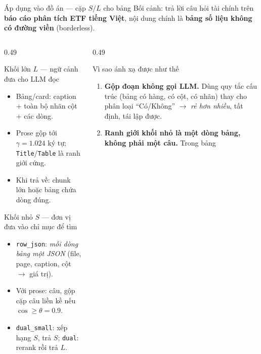 \documentclass[aspectratio=169,10pt]{beamer}
\begin{document}
\begin{frame}{Áp dụng vào đồ án --- cặp $S/L$ cho bảng}
  {\footnotesize Bối cảnh: trả lời câu hỏi tài chính trên \textbf{báo cáo phân tích ETF
  tiếng Việt}, nội dung chính là \textbf{bảng số liệu không có đường viền} (borderless).}
  \begin{columns}[T]
    \begin{column}{0.49\textwidth}
      \begin{block}{\small Khối lớn $L$ --- ngữ cảnh đưa cho LLM đọc}
        \footnotesize
        \begin{itemize}\scriptsize
          \itemsep1pt
          \item Bảng/card: caption $+$ toàn bộ nhãn cột $+$ các dòng.
          \item Prose gộp tới $\gamma=1.024$ ký tự; \texttt{Title}/\texttt{Table} là ranh giới cứng.
          \item Khi trả về: chunk lớn hoặc bảng chứa dòng đúng.
        \end{itemize}
      \end{block}
      \begin{block}{\small Khối nhỏ $S$ --- đơn vị đưa vào chỉ mục để tìm}
        \footnotesize
        \begin{itemize}\scriptsize
          \itemsep1pt
          \item \texttt{row\_json}: \emph{mỗi dòng bảng một JSON} (file, page, caption, cột $\to$ giá trị).
          \item Với prose: câu, gộp cặp câu liền kề nếu $\cos \ge \theta = 0.9$.
          \item \texttt{dual\_small}: xếp hạng $S$, trả $S$; \texttt{dual}: rerank rồi trả $L$.
        \end{itemize}
      \end{block}
    \end{column}
    \begin{column}{0.49\textwidth}
      \begin{block}{\small Vì sao ánh xạ được như thế}
        \footnotesize
        \begin{enumerate}\scriptsize
          \itemsep1pt
          \item \textbf{Gộp đoạn không gọi LLM.} Dùng quy tắc cấu trúc (bảng có hàng, có cột,
                có nhãn) thay cho phân loại ``Có/Không'' $\to$ \emph{rẻ hơn nhiều},
                tất định, tái lập được.
          \item \textbf{Ranh giới khối nhỏ là một dòng bảng, không phải một câu.} Trong bảng

\end{enumerate}
\end{block}
\end{column}
\end{columns}
\end{frame}
\end{document}
